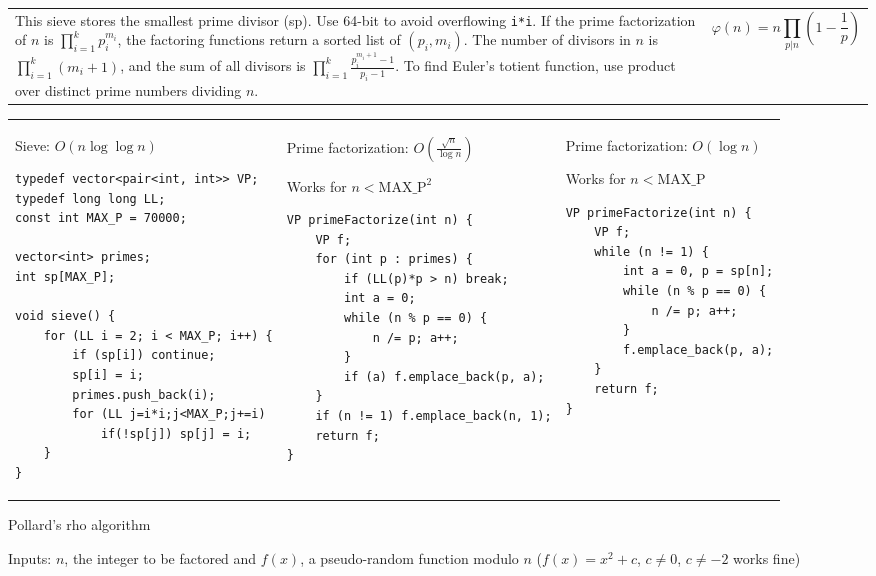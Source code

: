 \documentclass[letterpaper]{article}
\begin{document}
\begin{tabular}{@{}p{14cm}p{5cm}@{}}
	This sieve stores the smallest prime divisor (sp). Use 64-bit to avoid overflowing \texttt{i*i}. If the prime factorization of $n$ is $\prod_{i=1}^{k}p_i^{m_i}$, the factoring functions return a sorted list of $(p_i, m_i)$. The number of divisors in $n$ is $\prod_{i=1}^{k}(m_i+1)$, and the sum of all divisors is $\prod_{i=1}^{k}\frac{p_i^{m_i+1}-1}{p_i-1}$. To find Euler's totient function, use product over distinct prime numbers dividing $n$.
&
\vspace{-1em}
$$\varphi(n) = n\prod_{p|n}\left(1-\frac 1p\right)$$
\end{tabular}

\begin{tabular}{@{}p{6.5cm}p{6.5cm}p{6.5cm}@{}}

Sieve: $O\left(n\log\log n\right)$

\begin{lstlisting}
typedef vector<pair<int, int>> VP;
typedef long long LL;
const int MAX_P = 70000;

vector<int> primes;
int sp[MAX_P];

void sieve() {
	for (LL i = 2; i < MAX_P; i++) {
		if (sp[i]) continue;
		sp[i] = i;
		primes.push_back(i);
		for (LL j=i*i;j<MAX_P;j+=i)
			if(!sp[j]) sp[j] = i;
	}
}
\end{lstlisting}
&
Prime factorization: $O\left(\frac{\sqrt n}{\log n}\right)$

Works for $n<\mathrm{MAX\_P}^2$
\begin{lstlisting}
VP primeFactorize(int n) {
	VP f;
	for (int p : primes) {
		if (LL(p)*p > n) break;
		int a = 0;
		while (n % p == 0) {
			n /= p; a++;
		}
		if (a) f.emplace_back(p, a);
	}
	if (n != 1) f.emplace_back(n, 1);
	return f;
}
\end{lstlisting}
&
Prime factorization: $O\left(\log n\right)$

Works for $n<\mathrm{MAX\_P}$
\begin{lstlisting}
VP primeFactorize(int n) {
	VP f;
	while (n != 1) {
		int a = 0, p = sp[n];
		while (n % p == 0) {
			n /= p; a++;
		}
		f.emplace_back(p, a);
	}
	return f;
}
\end{lstlisting}
\end{tabular}

\vspace{-2em}
Pollard's rho algorithm

Inputs: $n$, the integer to be factored and $f(x)$, a pseudo-random function modulo $n$ ($f(x)=x^2+c$, $c\neq 0$, $c\neq -2$ works fine)
\end{document}
